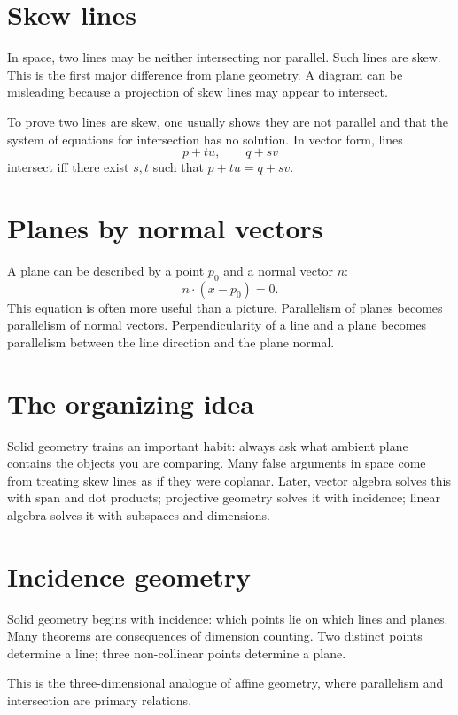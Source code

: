 \section{Skew lines}

In space, two lines may be neither intersecting nor parallel.  Such lines are skew.  This is the first major difference from plane geometry.  A diagram can be misleading because a projection of skew lines may appear to intersect.

To prove two lines are skew, one usually shows they are not parallel and that the system of equations for intersection has no solution.  In vector form, lines
\[
  p+tu,\qquad q+sv
\]
intersect iff there exist \(s,t\) such that \(p+tu=q+sv\).

\section{Planes by normal vectors}

A plane can be described by a point \(p_0\) and a normal vector \(n\):
\[
  n\cdot(x-p_0)=0.
\]
This equation is often more useful than a picture.  Parallelism of planes becomes parallelism of normal vectors.  Perpendicularity of a line and a plane becomes parallelism between the line direction and the plane normal.

\section{The organizing idea}

Solid geometry trains an important habit: always ask what ambient plane contains the objects you are comparing.  Many false arguments in space come from treating skew lines as if they were coplanar.  Later, vector algebra solves this with span and dot products; projective geometry solves it with incidence; linear algebra solves it with subspaces and dimensions.

\section{Incidence geometry}

Solid geometry begins with incidence: which points lie on which lines and planes.  Many theorems are consequences of dimension counting.  Two distinct points determine a line; three non-collinear points determine a plane.

This is the three-dimensional analogue of affine geometry, where parallelism and intersection are primary relations.

